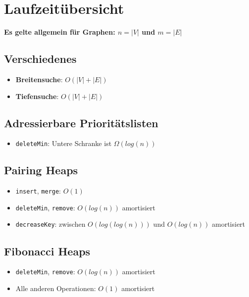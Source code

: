 \section{Laufzeitübersicht}%
\label{lz:sec:laufzeituebersicht}
\textbf{Es gelte allgemein für Graphen: $n = |V|$ und $m = |E|$}

\subsection{Verschiedenes}%
\label{lz:sub:verschiedenes}

\begin{itemize}
	\item \textbf{Breitensuche}: $O(|V| + |E|)$
	\item \textbf{Tiefensuche}: $O(|V| + |E|)$
\end{itemize}

\subsection{Adressierbare Prioritätslisten}%
\label{lz:sub:adressierbare_prioritaetslisten}

\begin{itemize}
	\item \texttt{deleteMin}: Untere Schranke ist $\Omega(log (n))$
\end{itemize}

\subsection{Pairing Heaps}%
\label{lz:sub:pairing_heaps}

\begin{itemize}
	\item \texttt{insert}, \texttt{merge}: $O(1)$
	\item \texttt{deleteMin}, \texttt{remove}: $O(log (n))$ amortisiert
	\item \texttt{decreaseKey}: zwischen $O(log (log (n)))$ und $O(log (n))$ amortisiert
\end{itemize}

\subsection{Fibonacci Heaps}%
\label{lz:sub:fibonacci_heaps}

\begin{itemize}
	\item \texttt{deleteMin}, \texttt{remove}: $O(log (n))$ amortisiert
	\item Alle anderen Operationen: $O(1)$ amortisiert
\end{itemize}

